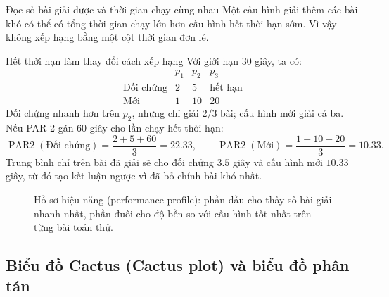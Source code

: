 \begin{keyidea}{Đọc số bài giải được và thời gian chạy cùng nhau}
Một cấu hình giải thêm các bài khó có thể có tổng thời gian chạy lớn hơn cấu
hình hết thời hạn sớm. Vì vậy không xếp hạng bằng một cột thời gian đơn lẻ.
\end{keyidea}

\begin{workedexample}{Hết thời hạn làm thay đổi cách xếp hạng}
Với giới hạn \(30\) giây, ta có:
\[
\begin{array}{c|ccc}
 & p_1&p_2&p_3\\\hline
\text{Đối chứng}&2&5&\text{hết hạn}\\
\text{Mới}&1&10&20
\end{array}
\]
Đối chứng nhanh hơn trên \(p_2\), nhưng chỉ giải \(2/3\) bài; cấu hình mới giải
cả ba. Nếu PAR-2 gán \(60\) giây cho lần chạy hết thời hạn:
\[
  \operatorname{PAR2}(\text{Đối chứng})=\frac{2+5+60}{3}=22.33,
  \qquad
  \operatorname{PAR2}(\text{Mới})=\frac{1+10+20}{3}=10.33.
\]
Trung bình chỉ trên bài đã giải sẽ cho đối chứng \(3.5\) giây và cấu hình mới
\(10.33\) giây, từ đó tạo kết luận ngược vì đã bỏ chính bài khó nhất.
\end{workedexample}

\begin{figure}[tb]
\centering
{}
\caption{Hồ sơ hiệu năng (performance profile): phần đầu cho thấy số bài giải nhanh nhất, phần đuôi
cho độ bền so với cấu hình tốt nhất trên từng bài toán thử.}
\label{fig:performance-profile}
\end{figure}

\subsection{Biểu đồ Cactus (Cactus plot) và biểu đồ phân tán}

